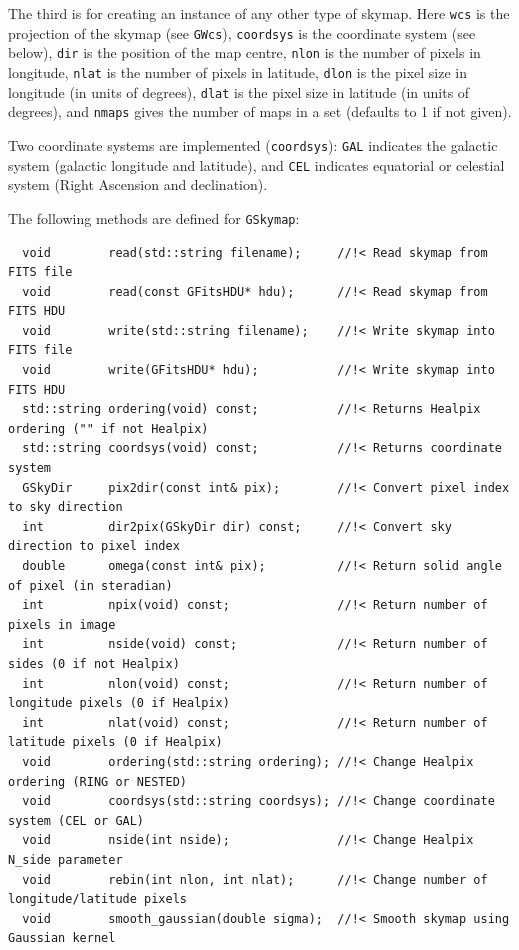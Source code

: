 \documentclass{article}[12pt,a4]
\begin{document}
The third is for creating an instance of any other type of skymap.
Here
{\tt wcs} is the projection of the skymap (see {\tt GWcs}),
{\tt coordsys} is the coordinate system (see below),
{\tt dir} is the position of the map centre,
{\tt nlon} is the number of pixels in longitude,
{\tt nlat} is the number of pixels in latitude,
{\tt dlon} is the pixel size in longitude (in units of degrees),
{\tt dlat} is the pixel size in latitude (in units of degrees),
and
{\tt nmaps} gives the number of maps in a set (defaults to 1 if not given).

Two coordinate systems are implemented ({\tt coordsys}):
{\tt GAL} indicates the galactic system (galactic longitude and latitude), and
{\tt CEL} indicates equatorial or celestial system (Right Ascension and declination).

The following methods are defined for {\tt GSkymap}:
\begin{verbatim}
  void        read(std::string filename);     //!< Read skymap from FITS file
  void        read(const GFitsHDU* hdu);      //!< Read skymap from FITS HDU
  void        write(std::string filename);    //!< Write skymap into FITS file
  void        write(GFitsHDU* hdu);           //!< Write skymap into FITS HDU
  std::string ordering(void) const;           //!< Returns Healpix ordering ("" if not Healpix)
  std::string coordsys(void) const;           //!< Returns coordinate system
  GSkyDir     pix2dir(const int& pix);        //!< Convert pixel index to sky direction
  int         dir2pix(GSkyDir dir) const;     //!< Convert sky direction to pixel index
  double      omega(const int& pix);          //!< Return solid angle of pixel (in steradian)
  int         npix(void) const;               //!< Return number of pixels in image
  int         nside(void) const;              //!< Return number of sides (0 if not Healpix)
  int         nlon(void) const;               //!< Return number of longitude pixels (0 if Healpix)
  int         nlat(void) const;               //!< Return number of latitude pixels (0 if Healpix)
  void        ordering(std::string ordering); //!< Change Healpix ordering (RING or NESTED)
  void        coordsys(std::string coordsys); //!< Change coordinate system (CEL or GAL)
  void        nside(int nside);               //!< Change Healpix N_side parameter
  void        rebin(int nlon, int nlat);      //!< Change number of longitude/latitude pixels
  void        smooth_gaussian(double sigma);  //!< Smooth skymap using Gaussian kernel
\end{verbatim}
\end{document}
